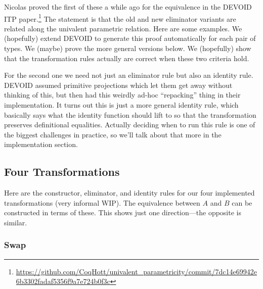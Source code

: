 

Nicolas proved the first of these a while ago
for the equivalence in the DEVOID ITP paper.\footnote{\url{https://github.com/CoqHott/univalent_parametricity/commit/7dc14e69942e6b3302fadaf5356f9a7e724b0f3c}}
The statement is that the old and new eliminator variants are related along the univalent parametric relation.
Here are some examples.
We (hopefully) extend DEVOID to generate this proof automatically for each pair of types.
We (maybe) prove the more general versions below. 
We (hopefully) show that the transformation rules actually are correct when these two criteria hold.

For the second one we need not just an eliminator rule but also an identity rule.
DEVOID assumed primitive projections which let them get away without thinking of this,
but then had this weirdly ad-hoc ``repacking'' thing in their implementation.
It turns out this is just a more general identity rule, which basically says what
the identity function should lift to so that the transformation preserves definitional equalities.
Actually deciding when to run this rule is one of the biggest challenges in practice,
so we'll talk about that more in the implementation section.

\subsection{Four Transformations}


Here are the constructor, eliminator, and identity rules for our four implemented transformations (very informal WIP).
The equivalence between $A$ and $B$ can be constructed in terms of these.
This shows just one direction---the opposite is similar.

\subsubsection{Swap}

